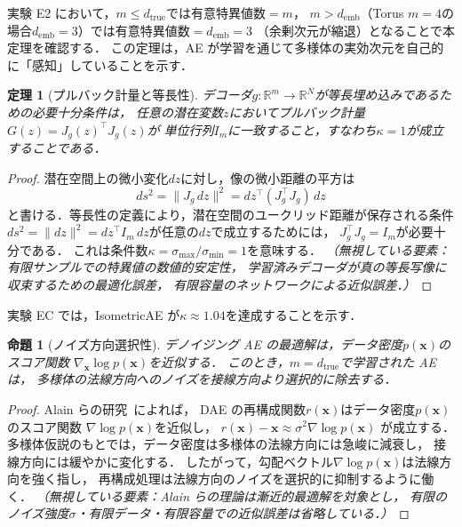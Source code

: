 \documentclass[12pt,a4paper]{jsarticle}
\newtheorem{theorem}{定理}
\newtheorem{proposition}{命題}
\newcommand{\dtrue}{d_{\mathrm{true}}}
\newcommand{\Jg}{J_g}
\newcommand{\R}{\mathbb{R}}
\newcommand{\kap}{\kappa}
\newcommand{\demb}{d_{\mathrm{emb}}}
\begin{document}
実験 E2 において，$m \leq \dtrue$では有意特異値数$= m$，
$m > \demb$（Torus $m=4$の場合$\demb = 3$）では有意特異値数$= \demb = 3$
（余剰次元が縮退）となることで本定理を確認する．
この定理は，AE が学習を通じて多様体の実効次元を自己的に「感知」していることを示す．

\begin{theorem}[プルバック計量と等長性]\label{thm:pullback}
デコーダ$g:\R^m\to\R^N$が等長埋め込みであるための必要十分条件は，
任意の潜在変数$z$においてプルバック計量$G(z) = \Jg(z)^\top \Jg(z)$が
単位行列$I_m$に一致すること，すなわち$\kap = 1$が成立することである．
\end{theorem}
\begin{proof}
潜在空間上の微小変化$dz$に対し，像の微小距離の平方は
\begin{equation*}
  ds^2 = \|J_g\, dz\|^2 = dz^\top (J_g^\top J_g)\, dz
\end{equation*}
と書ける．等長性の定義により，潜在空間のユークリッド距離が保存される条件
$ds^2 = \|dz\|^2 = dz^\top I_m\, dz$が任意の$dz$で成立するためには，
$J_g^\top J_g = I_m$が必要十分である．
これは条件数$\kap = \sigma_{\max}/\sigma_{\min} = 1$を意味する．
\textit{（無視している要素：有限サンプルでの特異値の数値的安定性，
学習済みデコーダが真の等長写像に収束するための最適化誤差，
有限容量のネットワークによる近似誤差．）}
\end{proof}

実験 EC では，IsometricAE が$\kap \approx 1.04$を達成することを示す．

\begin{proposition}[ノイズ方向選択性]\label{thm:nsr}
デノイジング AE の最適解は，データ密度$p(\boldsymbol{x})$のスコア関数
$\nabla_{\boldsymbol{x}}\log p(\boldsymbol{x})$を近似する．
このとき，$m = \dtrue$で学習された AE は，
多様体の法線方向へのノイズを接線方向より選択的に除去する．
\end{proposition}
\begin{proof}
Alain らの研究~\cite{alain2014dae}によれば，
DAE の再構成関数$r(\boldsymbol{x})$はデータ密度$p(\boldsymbol{x})$のスコア関数
$\nabla\log p(\boldsymbol{x})$を近似し，
$r(\boldsymbol{x}) - \boldsymbol{x} \approx \sigma^2 \nabla\log p(\boldsymbol{x})$
が成立する．
多様体仮説のもとでは，データ密度は多様体の法線方向には急峻に減衰し，
接線方向には緩やかに変化する．
したがって，勾配ベクトル$\nabla\log p(\boldsymbol{x})$は法線方向を強く指し，
再構成処理は法線方向のノイズを選択的に抑制するように働く．
\textit{（無視している要素：Alain ら\cite{alain2014dae}の理論は漸近的最適解を対象とし，
有限のノイズ強度$\sigma$・有限データ・有限容量での近似誤差は省略している．）}
\end{proof}
\end{document}
